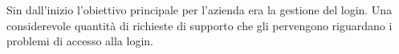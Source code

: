 Sin dall'inizio l'obiettivo principale per l'azienda era la gestione del login. 
%
Una considerevole quantità di richieste di supporto che gli pervengono riguardano i problemi di accesso alla login.
%
